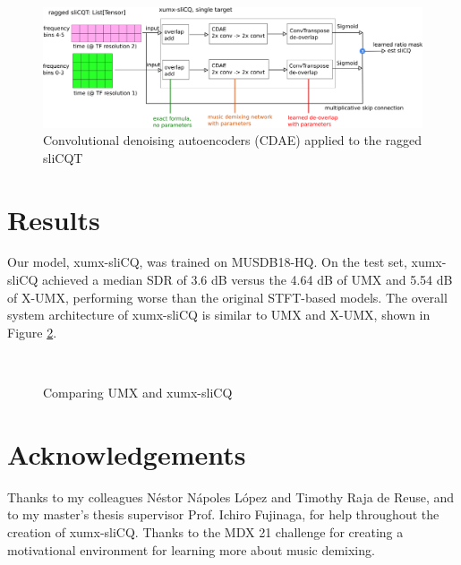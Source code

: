 \documentclass{article}
\begin{document}
\begin{figure}[h]
	\includegraphics[width=\textwidth]{./xumx_slicq_pertarget.png}
	\caption{Convolutional denoising autoencoders (CDAE) applied to the ragged sliCQT}
	\label{fig:ragged}
\end{figure}

\section{Results}
\label{sec:results}

Our model, xumx-sliCQ, was trained on MUSDB18-HQ. On the test set, xumx-sliCQ achieved a median SDR of 3.6 dB versus the 4.64 dB of UMX and 5.54 dB of X-UMX, performing worse than the original STFT-based models. The overall system architecture of xumx-sliCQ is similar to UMX and X-UMX, shown in Figure \ref{fig:blockdiagrams}.

\begin{figure}[h]
	\centering
	\\
	\vspace{1em}
	\caption{Comparing UMX and xumx-sliCQ}
	\label{fig:blockdiagrams}
\end{figure}

\section{Acknowledgements}
Thanks to my colleagues N{\'e}stor N{\'a}poles L{\'o}pez and Timothy Raja de Reuse, and to my master's thesis supervisor Prof. Ichiro Fujinaga, for help throughout the creation of xumx-sliCQ. Thanks to the MDX 21 challenge for creating a motivational environment for learning more about music demixing.
% 
\clearpage\vfill
%
\flushend


\end{document}
